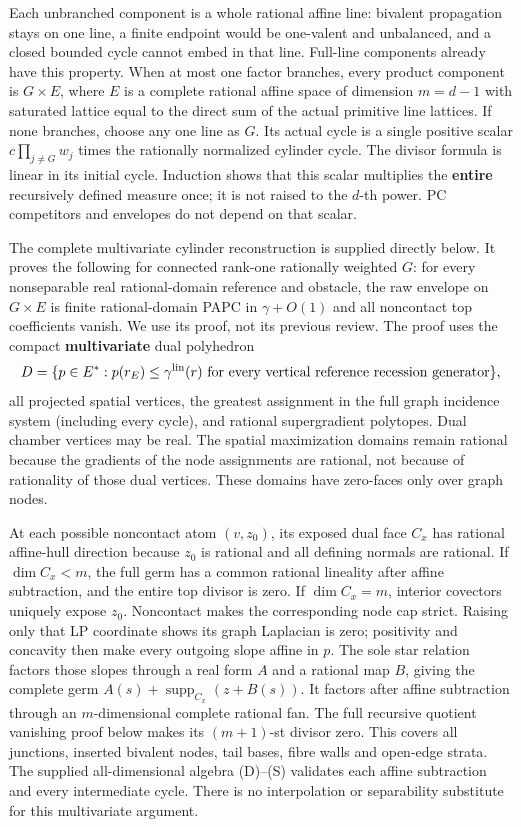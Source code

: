 \documentclass[
  11pt,
]{article}
\begin{document}
Each unbranched component is a whole rational affine line: bivalent
propagation stays on one line, a finite endpoint would be one-valent and
unbalanced, and a closed bounded cycle cannot embed in that line.
Full-line components already have this property. When at most one factor
branches, every product component is \(G\times E\), where \(E\) is a
complete rational affine space of dimension \(m=d-1\) with saturated
lattice equal to the direct sum of the actual primitive line lattices.
If none branches, choose any one line as \(G\). Its actual cycle is a
single positive scalar \(c\prod_{j\ne G}w_j\) times the rationally
normalized cylinder cycle. The divisor formula is linear in its initial
cycle. Induction shows that this scalar multiplies the \textbf{entire}
recursively defined measure once; it is not raised to the \(d\)-th
power. PC competitors and envelopes do not depend on that scalar.

The complete multivariate cylinder reconstruction is supplied directly
below. It proves the following for connected rank-one rationally
weighted \(G\): for every nonseparable real rational-domain reference
and obstacle, the raw envelope on \(G\times E\) is finite
rational-domain PAPC in \(\gamma+O(1)\) and all noncontact top
coefficients vanish. We use its proof, not its previous review. The
proof uses the compact \textbf{multivariate} dual polyhedron \[
 D=\{p\in E^*:p(r_E)\leq\gamma^{\rm lin}(r)
                 \text{ for every vertical reference recession generator}\},
\] all projected spatial vertices, the greatest assignment in the full
graph incidence system (including every cycle), and rational
supergradient polytopes. Dual chamber vertices may be real. The spatial
maximization domains remain rational because the gradients of the node
assignments are rational, not because of rationality of those dual
vertices. These domains have zero-faces only over graph nodes.

At each possible noncontact atom \((v,z_0)\), its exposed dual face
\(C_x\) has rational affine-hull direction because \(z_0\) is rational
and all defining normals are rational. If \(\dim C_x<m\), the full germ
has a common rational lineality after affine subtraction, and the entire
top divisor is zero. If \(\dim C_x=m\), interior covectors uniquely
expose \(z_0\). Noncontact makes the corresponding node cap strict.
Raising only that LP coordinate shows its graph Laplacian is zero;
positivity and concavity then make every outgoing slope affine in \(p\).
The sole star relation factors those slopes through a real form \(A\)
and a rational map \(B\), giving the complete germ
\(A(s)+\operatorname{supp}_{C_x}(z+B(s))\). It factors after affine
subtraction through an \(m\)-dimensional complete rational fan. The full
recursive quotient vanishing proof below makes its \((m+1)\)-st divisor
zero. This covers all junctions, inserted bivalent nodes, tail bases,
fibre walls and open-edge strata. The supplied all-dimensional algebra
(D)--(S) validates each affine subtraction and every intermediate cycle.
There is no interpolation or separability substitute for this
multivariate argument.
\end{document}
